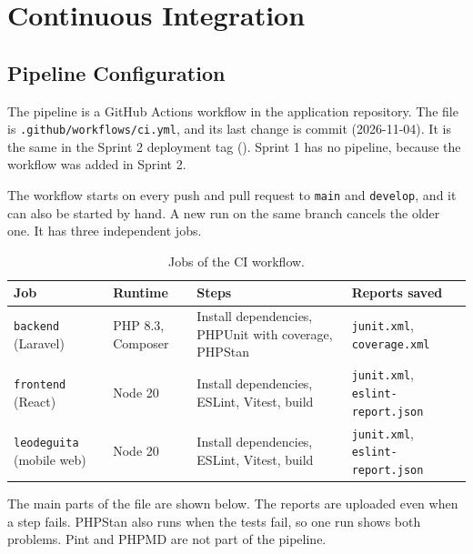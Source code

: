 \section{Continuous Integration}
\label{sec:ci}

\subsection{Pipeline Configuration}

The pipeline is a GitHub Actions workflow in the application repository.
The file is \texttt{.github/}\allowbreak\texttt{workflows/}\allowbreak\texttt{ci.yml}, and its last change is commit  (2026-11-04).
It is the same in the Sprint 2 deployment tag ().
Sprint 1 has no pipeline, because the workflow was added in Sprint 2.

The workflow starts on every push and pull request to \texttt{main} and \texttt{develop}, and it can also be started by hand.
A new run on the same branch cancels the older one.
It has three independent jobs.

\begin{table}[H]
  \centering
  \begin{tabularx}{\linewidth}{L{2.6cm}L{2.4cm}YL{3.8cm}}
    \toprule
    Job & Runtime & Steps & Reports saved \\
    \midrule
    \texttt{backend} (Laravel) & PHP 8.3, Composer &
    Install dependencies, PHPUnit with coverage, PHPStan &
    \texttt{junit.xml}, \texttt{coverage.xml} \\
    \texttt{frontend} (React) & Node 20 &
    Install dependencies, ESLint, Vitest, build &
    \texttt{junit.xml}, \texttt{eslint-report.json} \\
    \texttt{leodeguita} (mobile web) & Node 20 &
    Install dependencies, ESLint, Vitest, build &
    \texttt{junit.xml}, \texttt{eslint-report.json} \\
    \bottomrule
  \end{tabularx}
  \caption{Jobs of the CI workflow.}
  \label{tab:ci-jobs}
\end{table}

The main parts of the file are shown below.
The reports are uploaded even when a step fails.
PHPStan also runs when the tests fail, so one run shows both problems.
Pint and PHPMD are not part of the pipeline.

